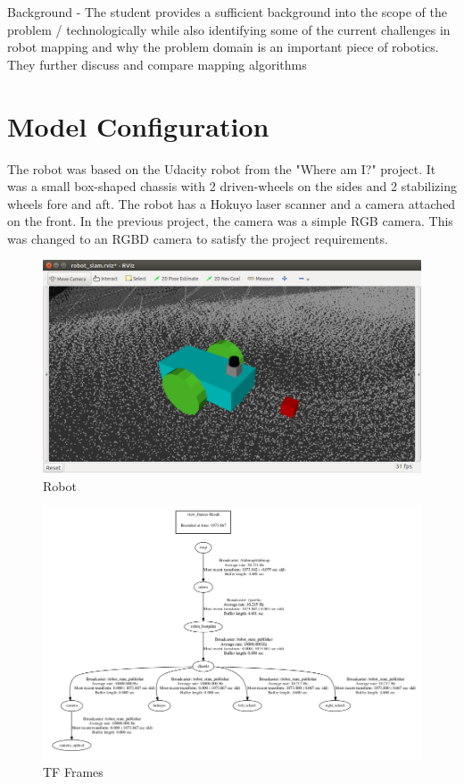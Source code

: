 \documentclass[10pt,journal,compsoc]{IEEEtran}
\begin{document}
Background - The student provides a sufficient background into the scope of the problem / technologically while also identifying some of the current challenges in robot mapping and why the problem domain is an important piece of robotics. They further discuss and compare mapping algorithms

\section{Model Configuration}
The robot was based on the Udacity robot from the "Where am I?" project. It was a small box-shaped chassis with 2 driven-wheels on the sides and 2 stabilizing wheels fore and aft. The robot has a Hokuyo laser scanner and a camera attached on the front. In the previous project, the camera was a simple RGB camera. This was changed to an RGBD camera to satisfy the project requirements.

\begin{figure}[thpb]
    \centering
    \includegraphics[width=\linewidth]{robot}
    \caption{Robot}
    \label{fig:robot}
\end{figure}

\begin{figure}[thpb]
    \centering
    \includegraphics[width=\linewidth]{frames}
    \caption{TF Frames}
    \label{fig:frames}
\end{figure}
\end{document}
